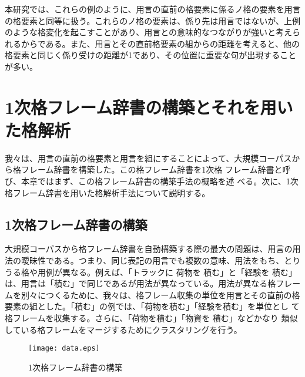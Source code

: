 \documentclass[fleqn]{nlp}
\begin{document}
本研究では、これらの例のように、用言の直前の格要素に係るノ格の要素を用言
の格要素と同等に扱う。これらのノ格の要素は、係り先は用言ではないが、上例
のような格変化を起こすことがあり、用言との意味的なつながりが強いと考えら
れるからである。また、用言とその直前格要素の組からの距離を考えると、他の
格要素と同じく係り受けの距離が1であり、その位置に重要な句が出現すること
が多い。


\section{1次格フレーム辞書の構築とそれを用いた格解析}

我々は、用言の直前の格要素と用言を組にすることによって、大規模コーパスか
ら格フレーム辞書を構築した\cite{Kawahara2002}。この格フレーム辞書を1次格
フレーム辞書と呼び、本章ではまず、この格フレーム辞書の構築手法の概略を述
べる。次に、1次格フレーム辞書を用いた格解析手法について説明する。


\subsection{1次格フレーム辞書の構築}
\label{Section::1次格フレーム辞書の構築}

大規模コーパスから格フレーム辞書を自動構築する際の最大の問題は、用言の用
法の曖昧性である。つまり、同じ表記の用言でも複数の意味、用法をもち、とり
うる格や用例が異なる。例えば、「トラックに 荷物を 積む」と「経験を 積む」
は、用言は「積む」で同じであるが用法が異なっている。用法が異なる格フレー
ムを別々につくるために、我々は、格フレーム収集の単位を用言とその直前の格
要素の組とした。「積む」の例では、「荷物を積む」「経験を積む」を単位とし
て格フレームを収集する。さらに、「荷物を積む」「物資を 積む」などかなり
類似している格フレームをマージするためにクラスタリングを行う。

\begin{figure}
  \begin{center}
  \texttt{[image: data.eps]}
  \caption{1次格フレーム辞書の構築}
  \label{図::1次格フレーム構築}
 \end{center}
\end{figure}
\end{document}
